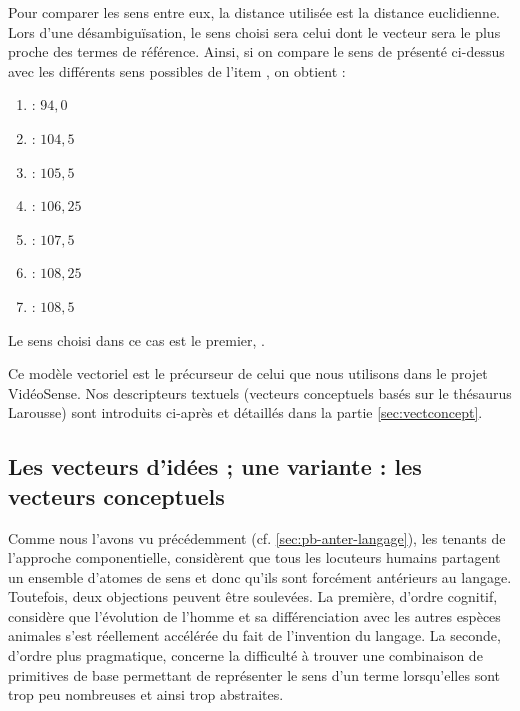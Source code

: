 {\begin{itemize}
\end{itemize}

Pour comparer les sens entre eux, la distance utilisée est la distance
euclidienne. Lors d'une désambiguïsation, le sens choisi sera celui
dont le vecteur sera le plus proche des termes de référence. Ainsi, si
on compare le sens de  présenté ci-dessus avec les
différents sens possibles de l'item , on obtient :

\begin{enumerate}
  
\item {} : $94,0$
  
\item {} : $104,5$
  
\item {} : $105,5$
  
\item {} : $106,25$
  
\item {} : $107,5$
  
\item {} : $108,25$
  
\item {} : $108,5$

\end{enumerate}

Le sens choisi dans ce cas est le premier, .

Ce modèle vectoriel est le précurseur de celui que nous utilisons dans le projet VidéoSense. Nos descripteurs textuels (vecteurs conceptuels basés
sur le thésaurus Larousse) sont introduits ci-après et détaillés dans la partie \ref{sec:vectconcept}. 

\subsection{Les vecteurs d'idées ; une variante  : les vecteurs conceptuels}

Comme nous l'avons vu précédemment (cf. \ref{sec:pb-anter-langage}),
les tenants de l'approche componentielle, considèrent que tous les
locuteurs humains partagent un ensemble d'atomes de sens et donc
qu'ils sont forcément antérieurs au langage. Toutefois, deux
objections peuvent être soulevées. La première, d'ordre cognitif,
considère que l'évolution de l'homme et sa différenciation avec les
autres espèces animales s'est réellement accélérée du fait de
l'invention du langage. La seconde, d'ordre plus pragmatique, concerne
la difficulté à trouver une combinaison de primitives de base
permettant de représenter le sens d'un terme lorsqu'elles sont trop
peu nombreuses et ainsi trop abstraites.

}
